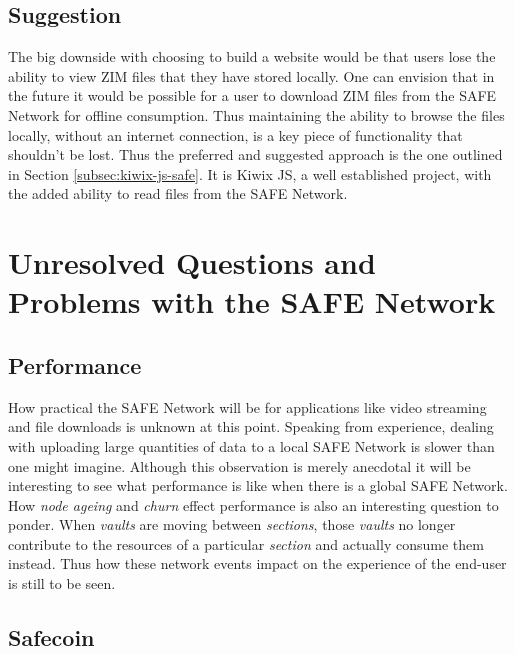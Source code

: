 \subsection{Suggestion}

The big downside with choosing to build a website would be that users lose the ability to view ZIM files that they have stored locally. One can envision that in the future it would be possible for a user to download ZIM files from the SAFE Network for offline consumption. Thus maintaining the ability to browse the files locally, without an internet connection, is a key piece of functionality that shouldn't be lost. Thus the preferred and suggested approach is the one outlined in Section \ref{subsec:kiwix-js-safe}. It is Kiwix JS, a well established project, with the added ability to read files from the SAFE Network.

\section{Unresolved Questions and Problems with the SAFE Network}

\subsection{Performance}
\label{subsec:problem-performance}

How practical the SAFE Network will be for applications like video streaming and file downloads is unknown at this point. Speaking from experience, dealing with uploading large quantities of data to a local SAFE Network is slower than one might imagine. Although this observation is merely anecdotal it will be interesting to see what performance is like when there is a global SAFE Network. How \textit{node ageing} and \textit{churn} effect performance is also an interesting question to ponder. When \textit{vaults} are moving between \textit{sections}, those \textit{vaults} no longer contribute to the resources of a particular \textit{section} and actually consume them instead. Thus how these network events impact on the experience of the end-user is still to be seen.

\subsection{Safecoin}
\label{subsec:problem-safecoin}

